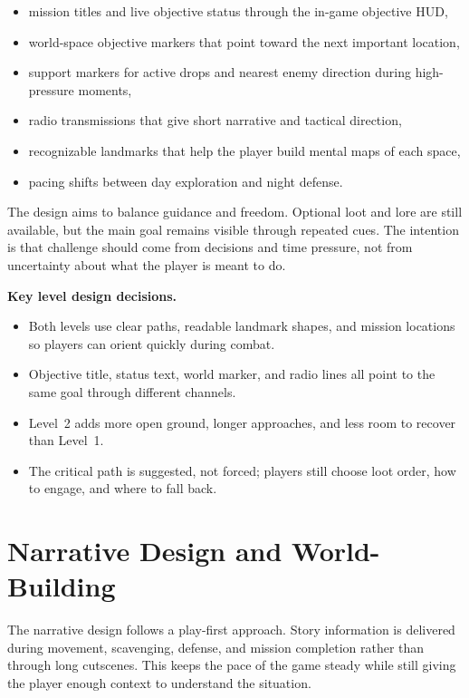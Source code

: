 \documentclass[11pt]{article}
\begin{document}
\begin{itemize}
    \item mission titles and live objective status through the in-game objective HUD,
    \item world-space objective markers that point toward the next important location,
    \item support markers for active drops and nearest enemy direction during high-pressure moments,
    \item radio transmissions that give short narrative and tactical direction,
    \item recognizable landmarks that help the player build mental maps of each space,
    \item pacing shifts between day exploration and night defense.
\end{itemize}

The design aims to balance guidance and freedom. Optional loot and lore are still available, but the main goal remains visible through repeated cues. The intention is that challenge should come from decisions and time pressure, not from uncertainty about what the player is meant to do.

\noindent\textbf{Key level design decisions.}
\begin{itemize}
    \item Both levels use clear paths, readable landmark shapes, and mission locations so players can orient quickly during combat.
    \item Objective title, status text, world marker, and radio lines all point to the same goal through different channels.
    \item Level~2 adds more open ground, longer approaches, and less room to recover than Level~1.
    \item The critical path is suggested, not forced; players still choose loot order, how to engage, and where to fall back.
\end{itemize}

\section{Narrative Design and World-Building}\label{sec:narrative}

The narrative design follows a play-first approach. Story information is delivered during movement, scavenging, defense, and mission completion rather than through long cutscenes. This keeps the pace of the game steady while still giving the player enough context to understand the situation.
\end{document}

